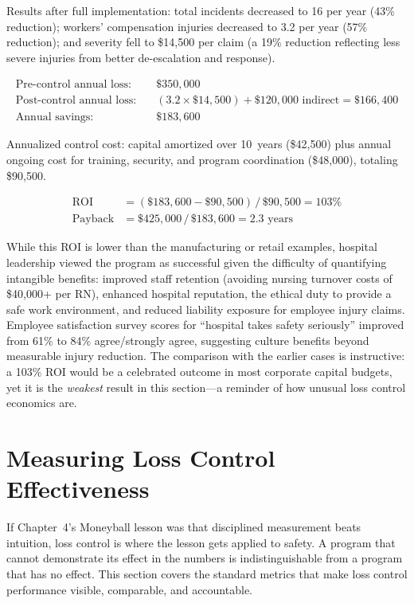 \documentclass[11pt,openany]{book}
\begin{document}
Results after full implementation: total incidents decreased to 16 per year
(43\% reduction); workers' compensation injuries decreased to 3.2 per year
(57\% reduction); and severity fell to \$14{,}500 per claim (a 19\% reduction
reflecting less severe injuries from better de-escalation and response).

\begin{align*}
\text{Pre-control annual loss:} \quad & \$350{,}000 \\
\text{Post-control annual loss:} \quad & (3.2 \times \$14{,}500) +
  \$120{,}000 \text{ indirect} = \$166{,}400 \\
\text{Annual savings:} \quad & \$183{,}600
\end{align*}

Annualized control cost: capital amortized over 10~years (\$42{,}500) plus
annual ongoing cost for training, security, and program coordination
(\$48{,}000), totaling \$90{,}500.

\begin{align*}
\text{ROI} &= (\$183{,}600 - \$90{,}500)\,/\,\$90{,}500 = 103\% \\
\text{Payback} &= \$425{,}000\,/\,\$183{,}600 = 2.3 \text{ years}
\end{align*}

While this ROI is lower than the manufacturing or retail examples, hospital
leadership viewed the program as successful given the difficulty of
quantifying intangible benefits: improved staff retention (avoiding nursing
turnover costs of \$40{,}000+ per RN), enhanced hospital reputation, the
ethical duty to provide a safe work environment, and reduced liability
exposure for employee injury claims. Employee satisfaction survey scores for
``hospital takes safety seriously'' improved from 61\% to 84\%
agree/strongly agree, suggesting culture benefits beyond measurable injury
reduction. The comparison with the earlier cases is instructive: a 103\% ROI
would be a celebrated outcome in most corporate capital budgets, yet it is the
\emph{weakest} result in this section---a reminder of how unusual loss control
economics are.

\section{Measuring Loss Control Effectiveness}
\label{sec:measurement}

If Chapter~4's Moneyball lesson was that disciplined measurement beats
intuition, loss control is where the lesson gets applied to safety. A program
that cannot demonstrate its effect in the numbers is indistinguishable from a
program that has no effect. This section covers the standard metrics that make
loss control performance visible, comparable, and accountable.
\end{document}
